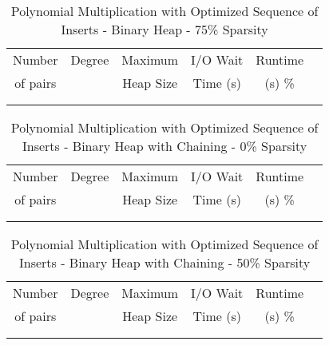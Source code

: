 \documentclass[11pt, one-sided]{amsart}
\begin{document}
\begin{table}[htbp]
   \centering
      \caption{Polynomial Multiplication with Optimized Sequence of Inserts - Binary Heap - 75\% Sparsity}
   \begin{tabular}{|c|c|c|c|c|c|}
   	\hline
		 Number   & 	Degree	& Maximum & I/O Wait		& Runtime 	 \\ 
		 of pairs 	&			& Heap Size	& Time (s)		&	(s)		 		\%				\\ \hline
		 		&			&			&			&						\\
		 		&			&			&			&						\\
   \end{tabular}
   \label{tab:booktabs}
\end{table}


\newpage



\begin{table}[htbp]
   \centering
      \caption{Polynomial Multiplication with Optimized Sequence of Inserts - Binary Heap with Chaining - 0\% Sparsity}
   \begin{tabular}{|c|c|c|c|c|c|}
   	\hline
		 Number   & 	Degree	& Maximum & I/O Wait		& Runtime 	 \\ 
		 of pairs 	&			& Heap Size	& Time (s)		&	(s)		 		\%				\\ \hline
		 		&			&			&			&						\\
		 		&			&			&			&						\\
   \end{tabular}
   \label{tab:booktabs}
\end{table}

\begin{table}[htbp]
   \centering
      \caption{Polynomial Multiplication with Optimized Sequence of Inserts - Binary Heap with Chaining - 50\% Sparsity}
   \begin{tabular}{|c|c|c|c|c|c|}
   	\hline
		 Number   & 	Degree	& Maximum & I/O Wait		& Runtime 	 \\ 
		 of pairs 	&			& Heap Size	& Time (s)		&	(s)		 		\%				\\ \hline
		 		&			&			&			&						\\
		 		&			&			&			&						\\
   \end{tabular}
   \label{tab:booktabs}
\end{table}
\end{document}
